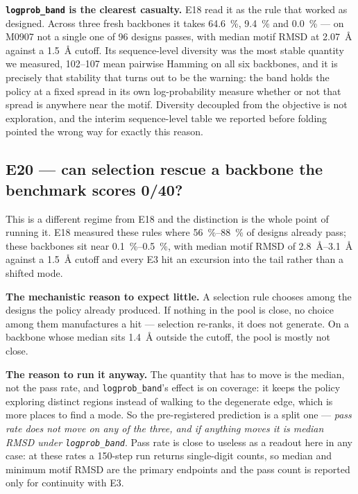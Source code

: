 \textbf{\texttt{logprob\_band} is the clearest casualty.} E18 read it as the rule
that worked as designed. Across three fresh backbones it takes
\SI{64.6}{\percent}, \SI{9.4}{\percent} and \SI{0.0}{\percent} --- on M0907 not a
single one of 96 designs passes, with median motif RMSD at \SI{2.07}{\angstrom}
against a \SI{1.5}{\angstrom} cutoff. Its sequence-level diversity was the most
stable quantity we measured, \numrange{102}{107} mean pairwise Hamming on all six
backbones, and it is precisely that stability that turns out to be the warning:
the band holds the policy at a fixed spread in its own log-probability measure
whether or not that spread is anywhere near the motif. Diversity decoupled from
the objective is not exploration, and the interim sequence-level table we
reported before folding pointed the wrong way for exactly this reason.

\subsection*{E20 --- can selection rescue a backbone the benchmark scores 0/40?}


This is a different regime from E18 and the distinction is the whole point of
running it. E18 measured these rules where \SIrange{56}{88}{\percent} of designs
already pass; these backbones sit near \SIrange{0.1}{0.5}{\percent}, with median
motif RMSD of \SIrange{2.8}{3.1}{\angstrom} against a \SI{1.5}{\angstrom} cutoff
and every E3 hit an excursion into the tail rather than a shifted mode.

\textbf{The mechanistic reason to expect little.} A selection rule chooses among
the designs the policy already produced. If nothing in the pool is close, no
choice among them manufactures a hit --- selection re-ranks, it does not
generate. On a backbone whose median sits \SI{1.4}{\angstrom} outside the cutoff,
the pool is mostly not close.

\textbf{The reason to run it anyway.} The quantity that has to move is the
median, not the pass rate, and \texttt{logprob\_band}'s effect is on coverage:
it keeps the policy exploring distinct regions instead of walking to the
degenerate edge, which is more places to find a mode. So the pre-registered
prediction is a split one --- \emph{pass rate does not move on any of the three,
and if anything moves it is median RMSD under \texttt{logprob\_band}}. Pass rate
is close to useless as a readout here in any case: at these rates a 150-step run
returns single-digit counts, so median and minimum motif RMSD are the primary
endpoints and the pass count is reported only for continuity with E3.

